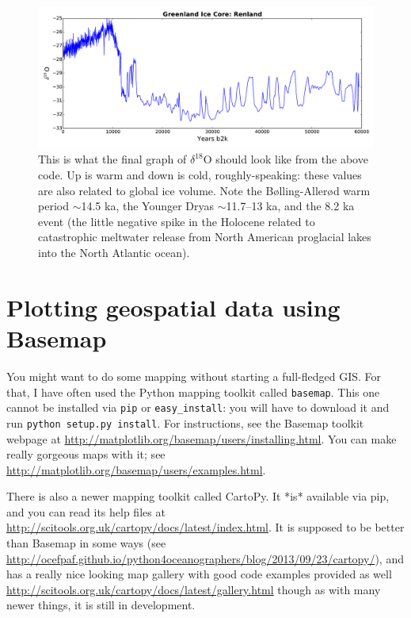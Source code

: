 \documentclass[a4paper,10pt]{scrartcl}
\begin{document}
\begin{figure}[!ht]
\begin{center}
\includegraphics[width=.9\linewidth]{figures/FilesData/GreenlandRenlandXLS.pdf}
\end{center}
\caption{This is what the final graph of $\delta^{18}$O should look like from the above code. Up is warm and down is cold, roughly-speaking: these values are also related to global ice volume. Note the Bølling-Allerød warm period $\sim$14.5 ka, the Younger Dryas $\sim$11.7--13 ka, and the 8.2 ka event (the little negative spike in the Holocene related to catastrophic meltwater release from North American proglacial lakes into the North Atlantic ocean).}
\end{figure}

\section{Plotting geospatial data using Basemap}

You might want to do some mapping without starting a full-fledged GIS. For that, I have often used the Python mapping toolkit called \lstinline{basemap}. This one cannot be installed via \lstinline{pip} or \lstinline{easy_install}: you will have to download it and run \lstinline{python setup.py install}. For instructions, see the Basemap toolkit webpage at \url{http://matplotlib.org/basemap/users/installing.html}. You can make really gorgeous maps with it; see \url{http://matplotlib.org/basemap/users/examples.html}.

There is also a newer mapping toolkit called CartoPy. It *is* available via pip, and you can read its help files at \url{http://scitools.org.uk/cartopy/docs/latest/index.html}. It is supposed to be better than Basemap in some ways (see \url{http://ocefpaf.github.io/python4oceanographers/blog/2013/09/23/cartopy/}), and has a really nice looking map gallery with good code examples provided as well \url{http://scitools.org.uk/cartopy/docs/latest/gallery.html} though as with many newer things, it is still in development.
\end{document}
